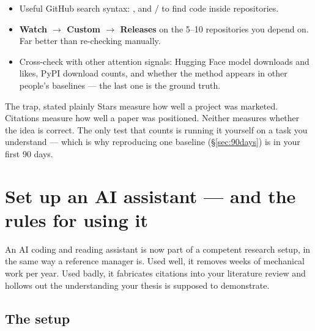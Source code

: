 \documentclass[11pt,a4paper]{article}
\begin{document}
\begin{itemize}
  \item Useful GitHub search syntax:
        , and
         /  to find code inside repositories.
  \item \textbf{Watch $\rightarrow$ Custom $\rightarrow$ Releases} on the 5--10
        repositories you depend on. Far better than re-checking manually.
  \item Cross-check with other attention signals: Hugging Face model downloads
        and likes, PyPI download counts, and whether the method appears in
        other people's baselines --- the last one is the ground truth.
\end{itemize}

\begin{wbox}{The trap, stated plainly}
Stars measure how well a project was marketed. Citations measure how well a
paper was positioned. Neither measures whether the idea is correct. The only
test that counts is running it yourself on a task you understand --- which is
why reproducing one baseline (\S\ref{sec:90days}) is in your first 90 days.
\end{wbox}

\section{Set up an AI assistant --- and the rules for using it}
\label{sec:assistant}

An AI coding and reading assistant is now part of a competent research setup,
in the same way a reference manager is. Used well, it removes weeks of
mechanical work per year. Used badly, it fabricates citations into your
literature review and hollows out the understanding your thesis is supposed to
demonstrate.

\subsection{The setup}
\end{document}
